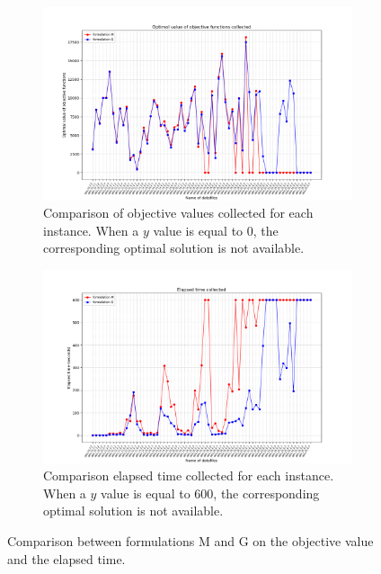 \documentclass[preprint,12pt,authoryear]{elsarticle}
\begin{document}
\begin{figure}[h!]
  \begin{center}
    \begin{subfigure}{1\textwidth}
      \includegraphics[scale=0.45]{images/resultsMGobjFct.png}
      \caption{Comparison of objective values collected for each instance. When a $y$ value is equal to 0, the corresponding optimal solution is not available.}
      \label{fig:resObjFctMG}
    \end{subfigure}
    \begin{subfigure}{1\textwidth}
      \includegraphics[scale=0.45]{images/resultsMGtime.png}
      \caption{Comparison elapsed time  collected for each instance. When a $y$ value is equal to 600, the corresponding optimal solution is not available.}
      \label{fig:resTimeMG}
    \end{subfigure}
  \end{center}
  \caption{Comparison between formulations M and G on the objective value and the elapsed time.}
   \label{fig:res1MG}
\end{figure}
\end{document}

